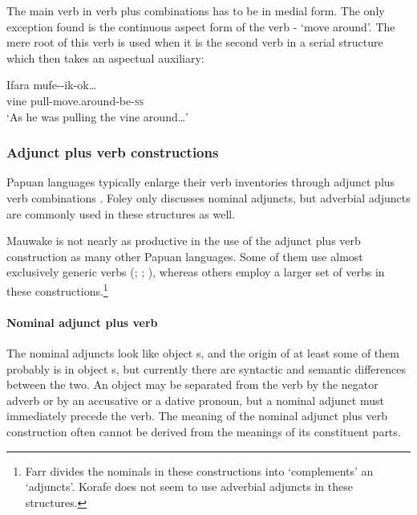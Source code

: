 The main verb in verb plus  combinations has to be in medial form. The only exception found is the continuous aspect form of the verb - `move around'. The mere root of this verb is used when it is the second verb in a serial structure which then takes an aspectual auxiliary:

\ea%
\label{ex:3:x391}
\gll Ifara mufe--ik-ok{\dots} \\
vine pull-move.around-be-\textsc{ss} \\
\glt`As he was pulling the vine around{\dots}'
\z

\subsubsection{Adjunct plus verb constructions} \label{sec:3.8.5.2}
{}
Papuan languages typically enlarge their verb inventories through adjunct plus verb combinations \citep[127]{Foley1986}. Foley only discusses nominal adjuncts, but adverbial adjuncts are commonly used in these structures as well. 

Mauwake is not nearly as productive in the use of the adjunct plus verb construction as many other Papuan languages. Some of them use almost exclusively generic verbs (\citealt[117]{Foley1986}; \citealt[309]{Roberts1987}; \citealt[145]{Whitehead2004}), whereas others employ a larger set of verbs \citep[62--66]{Farr1999} in these constructions.\footnote{Farr divides the nominals in these constructions into `complements' an `adjuncts'. Korafe does not seem to use adverbial adjuncts in these structures. } 

\paragraph{Nominal adjunct plus verb}\label{sec:3.8.5.2.1}
{}
The nominal adjuncts look like object s, and the origin of at least some of them probably is in object s, but currently there are syntactic and semantic differences between the two. An object  may be separated from the verb by the negator adverb  or by an accusative or a dative pronoun, but a nominal adjunct must immediately precede the verb. The meaning of the nominal adjunct plus verb construction often cannot be derived from the meanings of its constituent parts. 

